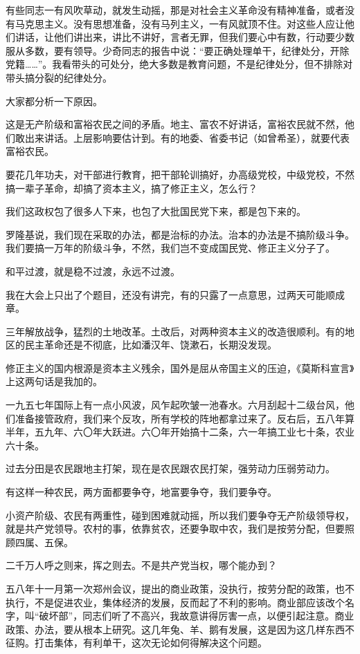 有些同志一有风吹草动，就发生动摇，那是对社会主义革命没有精神准备，或者没有马克思主义。没有思想准备，没有马列主义，一有风就顶不住。对这些人应让他们讲话，让他们讲出来，讲比不讲好，言者无罪，但我们要心中有数，行动要少数服从多数，要有领导。少奇同志的报告中说：“要正确处理单干，纪律处分，开除党籍……”。我看带头的可处分，绝大多数是教育问题，不是纪律处分，但不排除对带头搞分裂的纪律处分。

大家都分析一下原因。

这是无产阶级和富裕农民之间的矛盾。地主、富农不好讲话，富裕农民就不然，他们敢出来讲话。上层影响要估计到。有的地委、省委书记（如曾希圣），就要代表富裕农民。

要花几年功夫，对干部进行教育，把干部轮训搞好，办高级党校，中级党校，不然搞一辈子革命，却搞了资本主义，搞了修正主义，怎么行？

我们这政权包了很多人下来，也包了大批国民党下来，都是包下来的。

罗隆基说，我们现在采取的办法，都是治标的办法。治本的办法是不搞阶级斗争。我们要搞一万年的阶级斗争，不然，我们岂不变成国民党、修正主义分子了。

和平过渡，就是稳不过渡，永远不过渡。

我在大会上只出了个题目，还没有讲完，有的只露了一点意思，过两天可能顺成章。

三年解放战争，猛烈的土地改革。土改后，对两种资本主义的改造很顺利。有的地区的民主革命还是不彻底，比如潘汉年、饶漱石，长期没发现。

修正主义的国内根源是资本主义残余，国外是屈从帝国主义的压迫，《莫斯科宣言》上这两句话是我加的。

一九五七年国际上有一点小风波，风乍起吹皱一池春水。六月刮起十二级台风，他们准备接管政府，我们来个反攻，所有学校的阵地都拿过来了。反右后，五八年算半年，五九年、六〇年大跃进。六〇年开始搞十二条，六一年搞工业七十条，农业六十条。

过去分田是农民跟地主打架，现在是农民跟农民打架，强劳动力压弱劳动力。

有这样一种农民，两方面都要争夺，地富要争夺，我们要争夺。

小资产阶级、农民有两重性，碰到困难就动摇，所以我们要争夺无产阶级领导权，就是共产党领导。农村的事，依靠贫农，还要争取中农，我们是按劳分配，但要照顾四属、五保。

二千万人呼之则来，挥之则去。不是共产党当权，哪个能办到？

五八年十一月第一次郑州会议，提出的商业政策，没执行，按劳分配的政策，也不执行，不是促进农业，集体经济的发展，反而起了不利的影响。商业部应该改个名字，叫“破坏部”，同志们听了不高兴，我故意讲得厉害一点，以便引起注意。商业政策、办法，要从根本上研究。这几年兔、羊、鹅有发展，这是因为这几样东西不征购。打击集体，有利单干，这次无论如何得解决这个问题。

